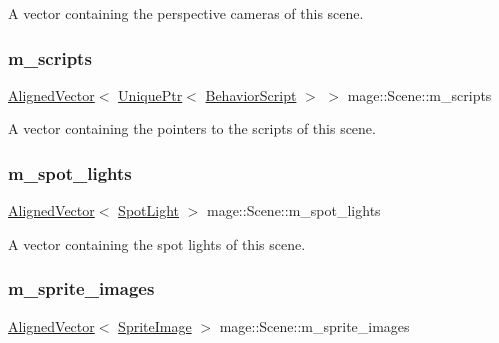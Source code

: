 A vector containing the perspective cameras of this scene. \hypertarget{classmage_1_1_scene_ae57ca3aeb6b0d8b2cb8cf40334b883f8}{}\label{classmage_1_1_scene_ae57ca3aeb6b0d8b2cb8cf40334b883f8} 
\subsubsection{\texorpdfstring{m\+\_\+scripts}{m\_scripts}}
{\footnotesize\ttfamily \hyperlink{namespacemage_a8664bfb5ce2179fc64eae9f82c8a5ba8}{Aligned\+Vector}$<$ \hyperlink{namespacemage_a3316d7143a973e37adf1110f2e80ca31}{Unique\+Ptr}$<$ \hyperlink{classmage_1_1_behavior_script}{Behavior\+Script} $>$ $>$ mage\+::\+Scene\+::m\+\_\+scripts\hspace{0.3cm}{\ttfamily [private]}}

A vector containing the pointers to the scripts of this scene. \hypertarget{classmage_1_1_scene_a6f8b7f605c83964334ee471cac448659}{}\label{classmage_1_1_scene_a6f8b7f605c83964334ee471cac448659} 
\subsubsection{\texorpdfstring{m\+\_\+spot\+\_\+lights}{m\_spot\_lights}}
{\footnotesize\ttfamily \hyperlink{namespacemage_a8664bfb5ce2179fc64eae9f82c8a5ba8}{Aligned\+Vector}$<$ \hyperlink{classmage_1_1_spot_light}{Spot\+Light} $>$ mage\+::\+Scene\+::m\+\_\+spot\+\_\+lights\hspace{0.3cm}{\ttfamily [private]}}

A vector containing the spot lights of this scene. \hypertarget{classmage_1_1_scene_aa93cc1b45ac10df888cccab41aa33480}{}\label{classmage_1_1_scene_aa93cc1b45ac10df888cccab41aa33480} 
\subsubsection{\texorpdfstring{m\+\_\+sprite\+\_\+images}{m\_sprite\_images}}
{\footnotesize\ttfamily \hyperlink{namespacemage_a8664bfb5ce2179fc64eae9f82c8a5ba8}{Aligned\+Vector}$<$ \hyperlink{classmage_1_1_sprite_image}{Sprite\+Image} $>$ mage\+::\+Scene\+::m\+\_\+sprite\+\_\+images\hspace{0.3cm}{\ttfamily [private]}}


